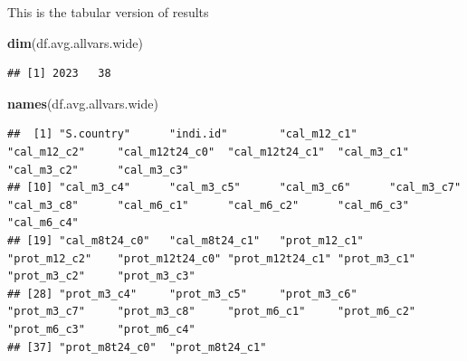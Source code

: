 \documentclass[
]{book}
\newenvironment{Shaded}{\begin{snugshade}}{\end{snugshade}}
\newcommand{\DataTypeTok}[1]{\textcolor[rgb]{0.13,0.29,0.53}{#1}}
\newcommand{\KeywordTok}[1]{\textcolor[rgb]{0.13,0.29,0.53}{\textbf{#1}}}
\newcommand{\NormalTok}[1]{#1}
\newcommand{\OperatorTok}[1]{\textcolor[rgb]{0.81,0.36,0.00}{\textbf{#1}}}
\newcommand{\OtherTok}[1]{\textcolor[rgb]{0.56,0.35,0.01}{#1}}
\newcommand{\StringTok}[1]{\textcolor[rgb]{0.31,0.60,0.02}{#1}}
\begin{document}
\begin{Shaded}
\end{Shaded}

This is the tabular version of results

\begin{Shaded}
\begin{Highlighting}[]
\KeywordTok{dim}\NormalTok{(df.avg.allvars.wide)}
\end{Highlighting}
\end{Shaded}

\begin{verbatim}
## [1] 2023   38
\end{verbatim}

\begin{Shaded}
\begin{Highlighting}[]
\KeywordTok{names}\NormalTok{(df.avg.allvars.wide)}
\end{Highlighting}
\end{Shaded}

\begin{verbatim}
##  [1] "S.country"      "indi.id"        "cal_m12_c1"     "cal_m12_c2"     "cal_m12t24_c0"  "cal_m12t24_c1"  "cal_m3_c1"      "cal_m3_c2"      "cal_m3_c3"     
## [10] "cal_m3_c4"      "cal_m3_c5"      "cal_m3_c6"      "cal_m3_c7"      "cal_m3_c8"      "cal_m6_c1"      "cal_m6_c2"      "cal_m6_c3"      "cal_m6_c4"     
## [19] "cal_m8t24_c0"   "cal_m8t24_c1"   "prot_m12_c1"    "prot_m12_c2"    "prot_m12t24_c0" "prot_m12t24_c1" "prot_m3_c1"     "prot_m3_c2"     "prot_m3_c3"    
## [28] "prot_m3_c4"     "prot_m3_c5"     "prot_m3_c6"     "prot_m3_c7"     "prot_m3_c8"     "prot_m6_c1"     "prot_m6_c2"     "prot_m6_c3"     "prot_m6_c4"    
## [37] "prot_m8t24_c0"  "prot_m8t24_c1"
\end{verbatim}
\end{document}
